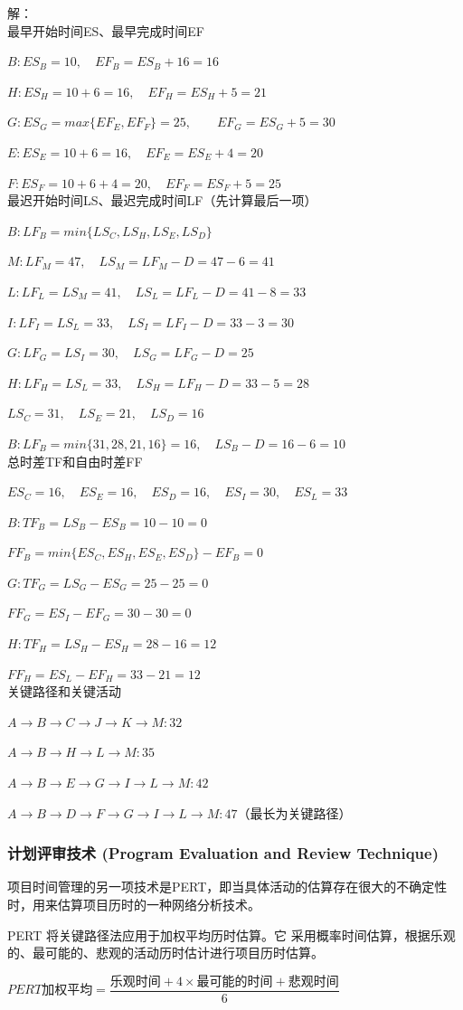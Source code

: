 解：
\\最早开始时间ES、最早完成时间EF
\par $B: ES_B=10,\quad EF_B=ES_B+16=16$
\par $H: ES_H=10+6=16,\quad EF_H=ES_H+5=21$
\par $G: ES_G=max\{EF_E,EF_F\}=25,\qquad EF_G=ES_G+5=30$
\par $E:ES_E=10+6=16,\quad EF_E=ES_E+4=20$
\par $F:ES_F=10+6+4=20,\quad EF_F=ES_F+5=25$
\\最迟开始时间LS、最迟完成时间LF（先计算最后一项）
\par $B:LF_B=min\{LS_C,LS_H,LS_E,LS_D\}$
\par $M:LF_M=47,\quad LS_M=LF_M-D=47-6=41$
\par $L:LF_L=LS_M=41,\quad LS_L=LF_L-D=41-8=33$
\par $I:LF_I=LS_L=33,\quad LS_I=LF_I-D=33-3=30$
\par $G:LF_G=LS_I=30,\quad LS_G=LF_G-D=25$
\par $H:LF_H=LS_L=33,\quad LS_H=LF_H-D=33-5=28$
\par $LS_C=31,\quad LS_E=21,\quad LS_D=16$
\par $B:LF_B=min\{31,28,21,16\}=16,\quad LS_B-D=16-6=10 $
\\总时差TF和自由时差FF
\par $ES_C=16,\quad ES_E=16,\quad ES_D=16,\quad ES_I=30,\quad ES_L=33$
\par $B:TF_B=LS_B-ES_B=10-10=0$
\par $FF_B=min\{ES_C,ES_H,ES_E,ES_D\}-EF_B=0$
\newline
\par $G:TF_G=LS_G-ES_G=25-25=0$
\par $FF_G=ES_I-EF_G=30-30=0$
\newline
\par $H:TF_H=LS_H-ES_H=28-16=12$
\par $FF_H=ES_L-EF_H=33-21=12$
\\关键路径和关键活动
\par $A\rightarrow B\rightarrow C\rightarrow J\rightarrow K\rightarrow M:32$
\par $A\rightarrow B\rightarrow H\rightarrow L\rightarrow M:35$
\par $A\rightarrow B\rightarrow E\rightarrow G\rightarrow I\rightarrow L\rightarrow M:42$
\par $A\rightarrow B\rightarrow D\rightarrow F\rightarrow G\rightarrow I\rightarrow L\rightarrow M:47$（最长为关键路径）
\subsubsection{计划评审技术 (Program Evaluation and Review Technique)}
项目时间管理的另一项技术是PERT，即当具体活动的估算存在很大的不确定性时，用来估算项目历时的一种网络分析技术。
\par PERT 将关键路径法应用于加权平均历时估算。它 采用概率时间估算，根据乐观的、最可能的、悲观的活动历时估计进行项目历时估算。
\begin{center}
	\Large{
		$
		PERT\text{加权平均}=\dfrac{\text{乐观时间}+4\times\text{最可能的时间}+\text{悲观时间}}{6}
		$
	}
\end{center}
